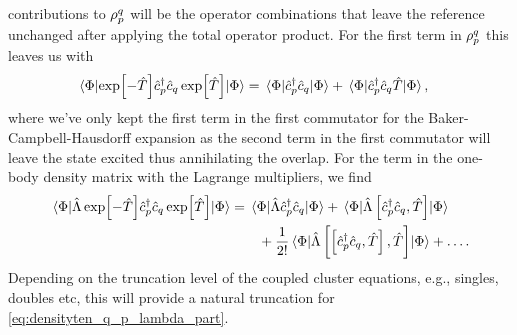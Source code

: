     contributions to $\rho^q_p$ will be the operator combinations that
    leave the reference unchanged after applying the total operator product.
    For the first term in $\rho^q_p$ this leaves us with
    \begin{align}
        \mel{\Phi}{
            \exp[-\hat{T}]
            \hat{c}_{p}^{\dagger}\hat{c}_{q}
            \exp[\hat{T}]
        }{\Phi}
        &= \mel{\Phi}{
            \hat{c}_{p}^{\dagger}\hat{c}_{q}
        }{\Phi}
        + \mel{\Phi}{
            \hat{c}_{p}^{\dagger}\hat{c}_{q}\hat{T}}{\Phi},
    \end{align}
    where we've only kept the first term in the first commutator for the
    Baker-Campbell-Hausdorff expansion as the second term in the first
    commutator will leave the state excited thus annihilating the overlap.
    For the term in the one-body density matrix with the Lagrange multipliers,
    we find
    \begin{align}
        \mel{\Phi}{
            \hat{\Lambda}\exp[-\hat{T}]
            \hat{c}_{p}^{\dagger}\hat{c}_{q}
            \exp[\hat{T}]
        }{\Phi}
        &= \mel{\Phi}{
            \hat{\Lambda}\hat{c}_{p}^{\dagger}\hat{c}_{q}
        }{\Phi}
        + \mel{\Phi}{
            \hat{\Lambda}\left[\hat{c}_{p}^{\dagger}\hat{c}_{q}, \hat{T}\right]
        }{\Phi}
        \nonumber \\
        &\qquad
        + \frac{1}{2!}
        \mel{\Phi}{
            \hat{\Lambda}\left[\left[\hat{c}_{p}^{\dagger}\hat{c}_{q}, \hat{T}\right], \hat{T}\right]
        }{\Phi}
        + \dots.
        \label{eq:densityten_q_p_lambda_part}
    \end{align}
    Depending on the truncation level of the coupled cluster equations, e.g.,
    singles, doubles etc, this will provide a natural truncation for
    \autoref{eq:densityten_q_p_lambda_part}.

